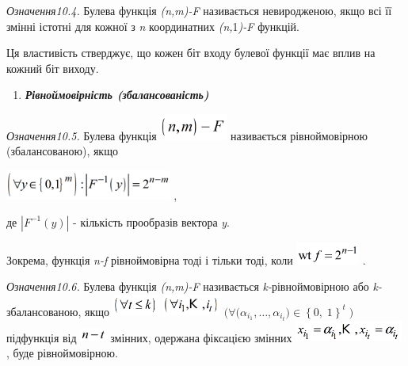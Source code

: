  \textit{Означення10.4.}\textit{ }Булева функція
\textit{(}\textit{n}\textit{,}\textit{m}\textit{)-}\textit{F}  називається
невиродженою, якщо всі її змінні істотні для кожної з \textit{n} координатних
\textit{(}\textit{n}\textit{,}1\textit{)-}\textit{F}  функцій.

Ця властивість стверджує, що кожен біт входу булевої функції має вплив на кожний
біт виходу.


\bigskip

\liststyleWWviiiNumxxix
\setcounter{saveenum}{\value{enumi}}
\begin{enumerate}
\setcounter{enumi}{\value{saveenum}}
\item {\bfseries\itshape
Рівноймовірність (збалансованість)}
\end{enumerate}
 \textit{Означення10.5.}\textit{ }Булева функція 
\includegraphics[width=0.8744in,height=0.3425in]{crypt-img/crypt-img196.png} 
називається рівноймовірною (збалансованою), якщо 

{\centering
 \includegraphics[width=2.1528in,height=0.389in]{crypt-img/crypt-img197.png} ,
\par}

де   $|F^{-1}(y)|$ - кількість прообразів вектора  \textit{y}.

Зокрема, функція \textit{n}\textit{{}-}\textit{f} рівноймовірна тоді і тільки
тоді, коли 
\includegraphics[width=0.8193in,height=0.278in]{crypt-img/crypt-img198.png} .

\textit{ }\textit{Означення10.6.}\textit{ }Булева функція
\textit{(}\textit{n}\textit{,}\textit{m}\textit{)-}\textit{F}  називається
\textit{k}\textit{{}-}рівноймовірною або \textit{k}\textit{{}-}збалансованою,
якщо 
\includegraphics[width=0.611in,height=0.278in]{crypt-img/crypt-img199.png}  
\includegraphics[width=0.75in,height=0.278in]{crypt-img/crypt-img200.png}  
${(\forall (\alpha _{i_{{1}}},\dots,\alpha _{i_{t}}{)\in
\left\{ 0,\;1 \right\}^{t}}{\;)}}$  підфункція від 
\includegraphics[width=0.3465in,height=0.1665in]{crypt-img/crypt-img201.png} 
змінних, одержана фіксацією змінних 
\includegraphics[width=1.389in,height=0.278in]{crypt-img/crypt-img202.png} ,
буде рівноймовірною.  


